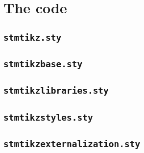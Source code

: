 \documentclass[%
  type=article,%
  layout=koma,%
  date=true,%
  hyperref=true,%
  listings=true,%
  tikz=false,%
]{stmtext}
\begin{document}
\newpage
\appendix

\section{The code}

\subsection{\protect\texttt{stmtikz.sty}}



\subsection{\protect\texttt{stmtikzbase.sty}}



\subsection{\protect\texttt{stmtikzlibraries.sty}}



\subsection{\protect\texttt{stmtikzstyles.sty}}



\subsection{\protect\texttt{stmtikzexternalization.sty}}


\end{document}
